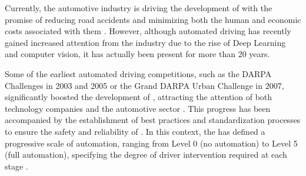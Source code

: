 

Currently, the automotive industry is driving the development of  with the promise of reducing road accidents and minimizing both the human and economic costs associated with them \cite{survey_AutomatedDriving1}. However, although automated driving has recently gained increased attention from the industry due to the rise of Deep Learning and computer vision, it has actually been present for more than 20 years.


Some of the earliest automated driving competitions, such as the DARPA Challenges in 2003 and 2005 or the Grand DARPA Urban Challenge in 2007, significantly boosted the development of , attracting the attention of both technology companies and the automotive sector \cite{survey_AutomatedDriving2}. This progress has been accompanied by the establishment of best practices and standardization processes to ensure the safety and reliability of . In this context, the  has defined a progressive scale of automation, ranging from Level 0 (no automation) to Level 5 (full automation), specifying the degree of driver intervention required at each stage \cite{AD_Technical_Standards}.

